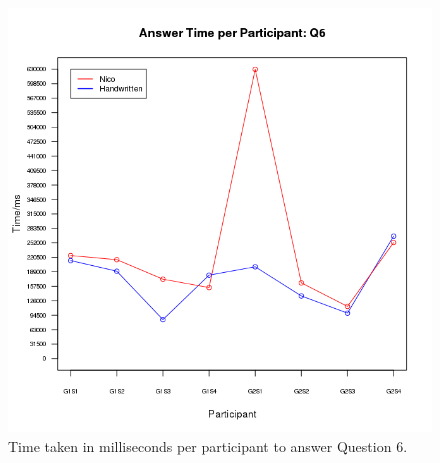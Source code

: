 \documentclass[12pt,twoside,notitlepage,xetex]{report}
\begin{document}
\begin{center}
\begin{figure}[H]
\begin{center}
\includegraphics[height=\textheight/2-2cm]{figs/graphs/q6.png}
\end{center}
\caption{Time taken in milliseconds per participant to answer Question 6.}
\end{figure}
\end{center}
\end{document}
